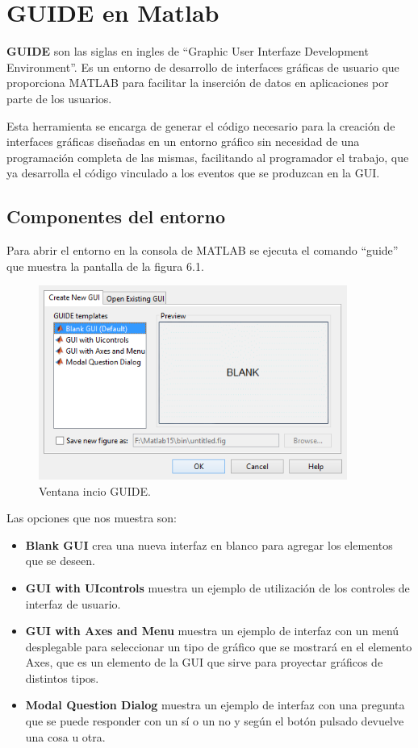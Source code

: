 \chapter{GUIDE en Matlab} \cite{ML} \cite{MML}

\textbf{GUIDE}  son las siglas en ingles de “Graphic User Interfaze Development Environment”. Es un entorno de desarrollo de interfaces gráficas de usuario que proporciona MATLAB para facilitar la inserción de datos en aplicaciones por parte de los usuarios.
\bigskip

Esta herramienta se encarga de generar el código necesario para la creación de interfaces gráficas diseñadas en un entorno gráfico sin necesidad de una programación completa de las mismas, facilitando al programador el trabajo, que ya desarrolla el código vinculado a los eventos que se produzcan en la GUI.

\section{Componentes del entorno}

Para abrir el entorno en la consola de MATLAB se ejecuta el comando “guide” que muestra la pantalla de la figura 6.1.

\begin{figure}
\centering
\includegraphics[width=0.9\textwidth]{imagenes/figuras/6_1.png}
\caption{Ventana incio GUIDE.}
\end{figure}

Las opciones que nos muestra son:

\begin{itemize}
\item \textbf{Blank GUI} crea una nueva interfaz en blanco para agregar los elementos que se deseen.
\item \textbf{GUI with UIcontrols} muestra un ejemplo de utilización de los controles de interfaz de usuario.
\item \textbf{GUI with Axes and Menu} muestra un ejemplo de interfaz con un menú desplegable para seleccionar un tipo de gráfico que se mostrará en el elemento Axes, que es un elemento de la GUI que sirve para proyectar gráficos de distintos tipos.
\item \textbf{Modal Question Dialog} muestra un ejemplo de interfaz con una pregunta que se puede responder con un sí o un no y según el botón pulsado devuelve una cosa u otra.
\end{itemize}

